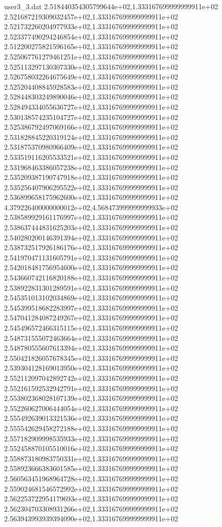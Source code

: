 \begin{filecontents}{user3_3.dat}
2.518440354305799644e+02,1.333167699999999911e+02
2.521687219309032457e+02,1.333167699999999911e+02
2.521732260204977933e+02,1.333167699999999911e+02
2.523377490294246854e+02,1.333167699999999911e+02
2.512200275821596165e+02,1.333167699999999911e+02
2.525067761279461251e+02,1.333167699999999911e+02
2.525113297130307330e+02,1.333167699999999911e+02
2.526758032264675649e+02,1.333167699999999911e+02
2.525204408845928583e+02,1.333167699999999911e+02
2.528448303249890046e+02,1.333167699999999911e+02
2.528494334055636727e+02,1.333167699999999911e+02
2.530138574235104727e+02,1.333167699999999911e+02
2.525386792497069166e+02,1.333167699999999911e+02
2.531828845220319124e+02,1.333167699999999911e+02
2.531875370980966409e+02,1.333167699999999911e+02
2.533519116205533521e+02,1.333167699999999911e+02
2.531968463386057238e+02,1.333167699999999911e+02
2.535209387190747918e+02,1.333167699999999911e+02
2.535256407906295522e+02,1.333167699999999911e+02
2.536899658175962600e+02,1.333167699999999911e+02
4.379226400000000012e+02,4.568473999999999933e+02
2.538589929161176997e+02,1.333167699999999911e+02
2.538637444831625203e+02,1.333167699999999911e+02
2.540280200146391394e+02,1.333167699999999911e+02
2.538732517926186176e+02,1.333167699999999911e+02
2.541970471131605791e+02,1.333167699999999911e+02
2.542018481756954600e+02,1.333167699999999911e+02
2.543660742116820188e+02,1.333167699999999911e+02
2.538922831301289591e+02,1.333167699999999911e+02
2.545351013102034869e+02,1.333167699999999911e+02
2.545399518682283997e+02,1.333167699999999911e+02
2.547041284087249267e+02,1.333167699999999911e+02
2.545496572466315115e+02,1.333167699999999911e+02
2.548731555072463664e+02,1.333167699999999911e+02
2.548780555607613394e+02,1.333167699999999911e+02
2.550421826057678345e+02,1.333167699999999911e+02
2.539304128169013950e+02,1.333167699999999911e+02
2.552112097042892742e+02,1.333167699999999911e+02
2.552161592532942791e+02,1.333167699999999911e+02
2.553802368028107139e+02,1.333167699999999911e+02
2.552260627006444054e+02,1.333167699999999911e+02
2.555492639013321536e+02,1.333167699999999911e+02
2.555542629458272188e+02,1.333167699999999911e+02
2.557182909998535933e+02,1.333167699999999911e+02
2.552458870105510016e+02,1.333167699999999911e+02
2.558873180983750331e+02,1.333167699999999911e+02
2.558923666383601585e+02,1.333167699999999911e+02
2.560563451968964728e+02,1.333167699999999911e+02
2.559024681546572992e+02,1.333167699999999911e+02
2.562253722954179693e+02,1.333167699999999911e+02
2.562304703308931266e+02,1.333167699999999911e+02
2.563943993939394090e+02,1.333167699999999911e+02

\end{filecontents}
